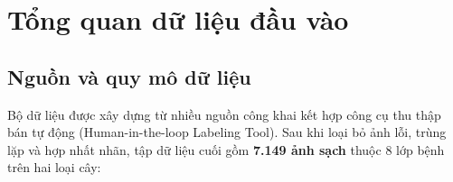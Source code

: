 
\section{Tổng quan dữ liệu đầu vào}
\label{sec:data}

\subsection{Nguồn và quy mô dữ liệu}

Bộ dữ liệu được xây dựng từ nhiều nguồn công khai kết hợp công cụ thu thập bán tự động (Human-in-the-loop Labeling Tool). Sau khi loại bỏ ảnh lỗi, trùng lặp và hợp nhất nhãn, tập dữ liệu cuối gồm \textbf{7.149 ảnh sạch} thuộc 8 lớp bệnh trên hai loại cây:

